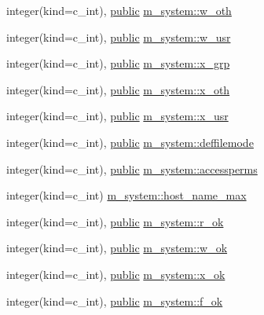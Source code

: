 \begin{DoxyCompactItemize}
\item 
integer(kind=c\+\_\+int), \hyperlink{M__stopwatch_83_8txt_a2f74811300c361e53b430611a7d1769f}{public} \hyperlink{namespacem__system_a1801bba1e36a51345d442f73839c93d2}{m\+\_\+system\+::w\+\_\+oth}
\item 
integer(kind=c\+\_\+int), \hyperlink{M__stopwatch_83_8txt_a2f74811300c361e53b430611a7d1769f}{public} \hyperlink{namespacem__system_a7d9b4b9dbb20baaf8793f8fa07f7e0bc}{m\+\_\+system\+::w\+\_\+usr}
\item 
integer(kind=c\+\_\+int), \hyperlink{M__stopwatch_83_8txt_a2f74811300c361e53b430611a7d1769f}{public} \hyperlink{namespacem__system_ad6577311415ac3c4a747b5cbbbfe1c2b}{m\+\_\+system\+::x\+\_\+grp}
\item 
integer(kind=c\+\_\+int), \hyperlink{M__stopwatch_83_8txt_a2f74811300c361e53b430611a7d1769f}{public} \hyperlink{namespacem__system_ac931698ef74075c45e8b1e33f9302d3e}{m\+\_\+system\+::x\+\_\+oth}
\item 
integer(kind=c\+\_\+int), \hyperlink{M__stopwatch_83_8txt_a2f74811300c361e53b430611a7d1769f}{public} \hyperlink{namespacem__system_a0674408245cc1bdfd6fcfdbe179e63f5}{m\+\_\+system\+::x\+\_\+usr}
\item 
integer(kind=c\+\_\+int), \hyperlink{M__stopwatch_83_8txt_a2f74811300c361e53b430611a7d1769f}{public} \hyperlink{namespacem__system_ac5de3a592742c0daa16a4f367ea41c74}{m\+\_\+system\+::deffilemode}
\item 
integer(kind=c\+\_\+int), \hyperlink{M__stopwatch_83_8txt_a2f74811300c361e53b430611a7d1769f}{public} \hyperlink{namespacem__system_aebf870d5d43a6bd77ae469c795008109}{m\+\_\+system\+::accessperms}
\item 
integer(kind=c\+\_\+int) \hyperlink{namespacem__system_aa09d58a58be96e7d172c8c2b14744cdb}{m\+\_\+system\+::host\+\_\+name\+\_\+max}
\item 
integer(kind=c\+\_\+int), \hyperlink{M__stopwatch_83_8txt_a2f74811300c361e53b430611a7d1769f}{public} \hyperlink{namespacem__system_a801e3ccad38d0814e4f1e62e939e9649}{m\+\_\+system\+::r\+\_\+ok}
\item 
integer(kind=c\+\_\+int), \hyperlink{M__stopwatch_83_8txt_a2f74811300c361e53b430611a7d1769f}{public} \hyperlink{namespacem__system_a05afbb3a08aad5483f51570d6fbccd77}{m\+\_\+system\+::w\+\_\+ok}
\item 
integer(kind=c\+\_\+int), \hyperlink{M__stopwatch_83_8txt_a2f74811300c361e53b430611a7d1769f}{public} \hyperlink{namespacem__system_a1026112f5dba28c9a8b8393524c2682f}{m\+\_\+system\+::x\+\_\+ok}
\item 
integer(kind=c\+\_\+int), \hyperlink{M__stopwatch_83_8txt_a2f74811300c361e53b430611a7d1769f}{public} \hyperlink{namespacem__system_a88c1027ebd95e4fb92e57c5d764e5689}{m\+\_\+system\+::f\+\_\+ok}
\end{DoxyCompactItemize}

